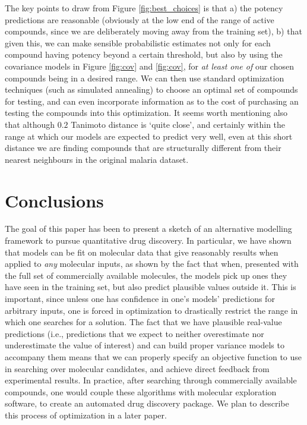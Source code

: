 \documentclass{article}
\begin{document}
The key points to draw from Figure \ref{fig:best_choices} is that a) the potency predictions are reasonable (obviously at the low end of the range of active compounds, since we are deliberately moving away from the training set), b) that given this, we can make sensible probabilistic estimates not only for each compound having potency beyond a certain threshold, but also by using the covariance models in Figure \ref{fig:cov} and \ref{fig:cov}, for \textit{at least one of} our chosen compounds being in a desired range.   We can then use standard optimization techniques (such as simulated annealing) to choose an optimal set of compounds for testing, and can even incorporate information as to the cost of purchasing an testing the compounds into this optimization.  It seems worth mentioning also that although $0.2$ Tanimoto distance is `quite close', and certainly within the range at which our models are expected to predict very well, even at this short distance we are finding compounds that are structurally different from their nearest neighbours in the original malaria dataset.  


\section{Conclusions}
The goal of this paper
has been to present a sketch of an alternative modelling framework to pursue quantitative drug discovery.
In particular, we have shown that models can be fit on molecular data that give reasonably results when applied to \textit{any} molecular inputs, as shown by the fact that when, presented with the full set of commercially available molecules, the models pick up ones they have seen in the training set, but also predict plausible values outside it.  This is important, since unless one has confidence in one's models' predictions for arbitrary inputs, one is forced in optimization to drastically restrict the range in which one searches for a solution.   The fact that we have plausible real-value predictions (i.e., predictions that we expect to neither overestimate nor underestimate the value of interest) and can build proper variance models to accompany them means that we can properly specify an objective function to use in searching over molecular candidates, and achieve direct feedback from experimental results.  In practice, after searching through commercially available compounds, one would couple these algorithms with molecular exploration software\cite{Firth2015,Merk2018}, 
to create an automated drug discovery package.  We plan to describe this process of optimization in a later paper.
\end{document}
